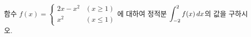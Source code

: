 함수 $f(x)=\begin{cases} 2x-x^2 & (x\ge 1) \\ x^2 & (x\le 1) \end{cases}$에 대하여 정적분 $\displaystyle\int_{-2}^{2} f(x)\mkern3mu dx$의 값을 구하시오.
